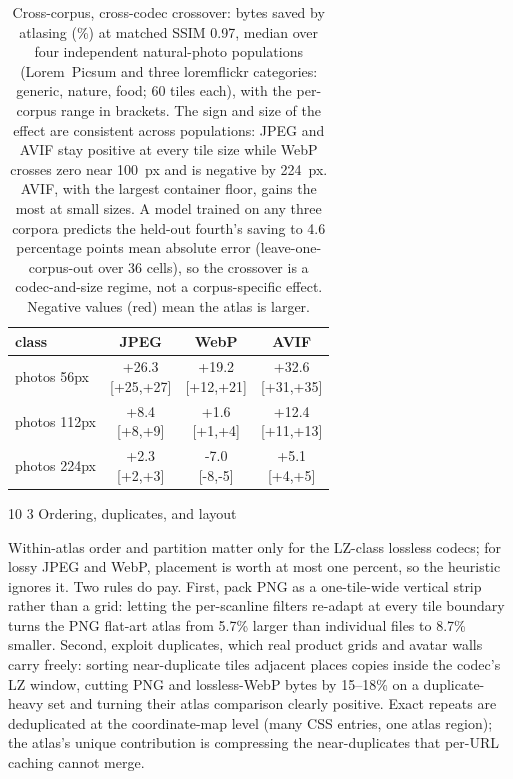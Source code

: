 \documentclass[3p,twocolumn]{elsarticle}
\makeatletter
\newcommand{\nv}[1]{\textcolor{negred}{#1}}
\newcommand{\rng}[1]{{\scriptsize\color{greyx}#1}}
\renewcommand\subsection{\@startsection{subsection}{2}{\z@}%
           {10\p@ \@plus 3\p@ \@minus 3\p@}%
           {3\p@ \@plus 2\p@ \@minus 1\p@}%
           {\normalfont\normalsize\itshape}}
\makeatother
\begin{document}
\begin{table}[t]
\centering
\small
\setlength{\tabcolsep}{4pt}
\begin{tabular}{@{}l ccc@{}}
\toprule
class & JPEG & WebP & AVIF \\
\midrule
photos 56px & \makecell{+26.3\\ \rng{[+25,+27]}} & \makecell{+19.2\\ \rng{[+12,+21]}} & \makecell{+32.6\\ \rng{[+31,+35]}} \\
photos 112px & \makecell{+8.4\\ \rng{[+8,+9]}} & \makecell{+1.6\\ \rng{[+1,+4]}} & \makecell{+12.4\\ \rng{[+11,+13]}} \\
photos 224px & \makecell{+2.3\\ \rng{[+2,+3]}} & \makecell{\nv{-7.0}\\ \rng{[-8,-5]}} & \makecell{+5.1\\ \rng{[+4,+5]}} \\
\bottomrule
\end{tabular}
\caption{Cross-corpus, cross-codec crossover: bytes saved by
atlasing (\%) at matched SSIM 0.97, median over four independent
natural-photo populations (Lorem~Picsum and three loremflickr
categories: generic, nature, food; 60 tiles each), with the per-corpus
range in brackets. The sign and size of the effect are consistent across
populations: JPEG and AVIF stay positive at every tile size while WebP
crosses zero near 100~px and is negative by 224~px. AVIF, with the
largest container floor, gains the most at small sizes. A model trained
on any three corpora predicts the held-out fourth's
saving to 4.6 percentage points mean absolute error
(leave-one-corpus-out over 36 cells), so the crossover is a
codec-and-size regime, not a corpus-specific effect. Negative values
(red) mean the atlas is larger.}

\end{table}


\subsection{Ordering, duplicates, and
layout}

Within-atlas order and partition matter only for the LZ-class lossless
codecs; for lossy JPEG and WebP, placement is worth at most one percent,
so the heuristic ignores it. Two rules do pay. First, pack PNG as a
one-tile-wide vertical strip rather than a grid: letting the
per-scanline filters re-adapt at every tile boundary turns the PNG
flat-art atlas from 5.7\% larger than individual files to 8.7\% smaller.
Second, exploit duplicates, which real product grids and avatar walls
carry freely: sorting near-duplicate tiles adjacent places copies inside
the codec's LZ window, cutting PNG and lossless-WebP
bytes by 15--18\% on a duplicate-heavy set and turning their atlas
comparison clearly positive. Exact repeats are deduplicated at the
coordinate-map level (many CSS entries, one atlas region); the
atlas's unique contribution is compressing the
near-duplicates that per-URL caching cannot merge.
\end{document}
